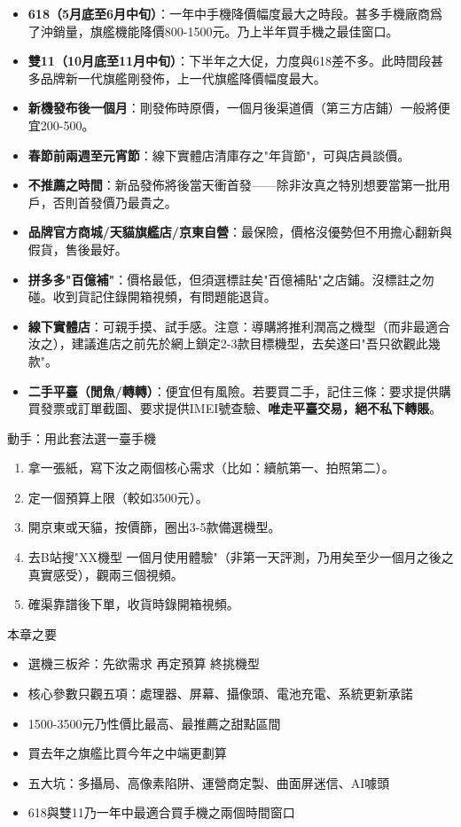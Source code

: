 
\begin{itemize}
  \item \textbf{618（5月底至6月中旬）}：一年中手機降價幅度最大之時段。甚多手機廠商爲了沖銷量，旗艦機能降價800-1500元。乃上半年買手機之最佳窗口。
  \item \textbf{雙11（10月底至11月中旬）}：下半年之大促，力度與618差不多。此時間段甚多品牌新一代旗艦剛發佈，上一代旗艦降價幅度最大。
  \item \textbf{新機發布後一個月}：剛發佈時原價，一個月後渠道價（第三方店鋪）一般將便宜200-500。
  \item \textbf{春節前兩週至元宵節}：線下實體店清庫存之"年貨節"，可與店員談價。
  \item \textbf{不推薦之時間}：新品發佈將後當天衝首發——除非汝真之特別想要當第一批用戶，否則首發價乃最貴之。
\end{itemize}


\begin{itemize}
  \item \textbf{品牌官方商城/天貓旗艦店/京東自營}：最保險，價格沒優勢但不用擔心翻新與假貨，售後最好。
  \item \textbf{拼多多"百億補"}：價格最低，但須選標註矣"百億補貼"之店鋪。沒標註之勿碰。收到貨記住錄開箱視頻，有問題能退貨。
  \item \textbf{線下實體店}：可親手摸、試手感。注意：導購將推利潤高之機型（而非最適合汝之），建議進店之前先於網上鎖定2-3款目標機型，去矣遂曰"吾只欲觀此幾款"。
  \item \textbf{二手平臺（閒魚/轉轉）}：便宜但有風險。若要買二手，記住三條：要求提供購買發票或訂單截圖、要求提供IMEI號查驗、\textbf{唯走平臺交易，絕不私下轉賬}。
\end{itemize}

\begin{tcbpractice}{動手：用此套法選一臺手機}
\begin{enumerate}
  \item 拿一張紙，寫下汝之兩個核心需求（比如：續航第一、拍照第二）。
  \item 定一個預算上限（較如3500元）。
  \item 開京東或天貓，按價篩，圈出3-5款備選機型。
  \item 去B站搜"XX機型 一個月使用體驗"（非第一天評測，乃用矣至少一個月之後之真實感受），觀兩三個視頻。
  \item 確渠靠譜後下單，收貨時錄開箱視頻。
\end{enumerate}

\end{tcbpractice}

\begin{tcbsummary}{本章之要}
\begin{itemize}
  \item 選機三板斧：先欲需求 再定預算 終挑機型
  \item 核心參數只觀五項：處理器、屏幕、攝像頭、電池充電、系統更新承諾
  \item 1500-3500元乃性價比最高、最推薦之甜點區間
  \item 買去年之旗艦比買今年之中端更劃算
  \item 五大坑：多攝局、高像素陷阱、運營商定製、曲面屏迷信、AI噱頭
  \item 618與雙11乃一年中最適合買手機之兩個時間窗口
\end{itemize}

\end{tcbsummary}
